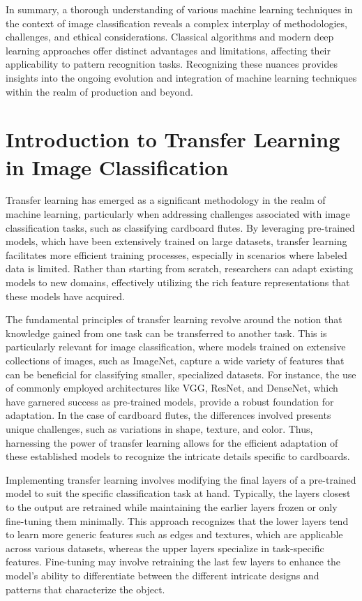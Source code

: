 In summary, a thorough understanding of various machine learning techniques in the context of image classification reveals a complex interplay of methodologies, challenges, and ethical considerations. Classical algorithms and modern deep learning approaches offer distinct advantages and limitations, affecting their applicability to pattern recognition tasks. Recognizing these nuances provides insights into the ongoing evolution and integration of machine learning techniques within the realm of production and beyond.

\section{Introduction to Transfer Learning in Image Classification}

Transfer learning has emerged as a significant methodology in the realm of machine learning, particularly when addressing challenges associated with image classification tasks, such as classifying cardboard flutes. By leveraging pre-trained models, which have been extensively trained on large datasets, transfer learning facilitates more efficient training processes, especially in scenarios where labeled data is limited. Rather than starting from scratch, researchers can adapt existing models to new domains, effectively utilizing the rich feature representations that these models have acquired.


The fundamental principles of transfer learning revolve around the notion that knowledge gained from one task can be transferred to another task. This is particularly relevant for image classification, where models trained on extensive collections of images, such as ImageNet, capture a wide variety of features that can be beneficial for classifying smaller, specialized datasets. For instance, the use of commonly employed architectures like VGG, ResNet, and DenseNet, which have garnered success as pre-trained models, provide a robust foundation for adaptation. In the case of cardboard flutes, the differences involved presents unique challenges, such as variations in shape, texture, and color. Thus, harnessing the power of transfer learning allows for the efficient adaptation of these established models to recognize the intricate details specific to cardboards.


Implementing transfer learning involves modifying the final layers of a pre-trained model to suit the specific classification task at hand. Typically, the layers closest to the output are retrained while maintaining the earlier layers frozen or only fine-tuning them minimally. This approach recognizes that the lower layers tend to learn more generic features such as edges and textures, which are applicable across various datasets, whereas the upper layers specialize in task-specific features. Fine-tuning may involve retraining the last few layers to enhance the model's ability to differentiate between the different intricate designs and patterns that characterize the object.



